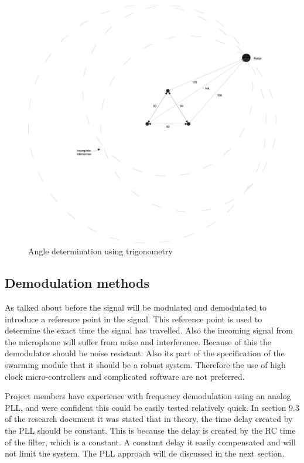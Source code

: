 \documentclass[10pt,a4paper]{article}
\begin{document}
\begin{figure}[H]
\centering
\includegraphics[width=1\textwidth]{trigonometry.pdf}
\caption{Angle determination using trigonometry}
\label{trigonometry}
\end{figure}

\subsection{Demodulation methods}
As talked about before the signal will be modulated and demodulated to introduce a reference point in the signal. This reference point is used to  determine the exact time the signal has travelled. Also the incoming signal from the microphone will suffer from noise and interference. Because of this the demodulator should be noise resistant. Also its part of the specification of the swarming module that it should be a robust system. Therefore the use of high clock micro-controllers and complicated software are not preferred.

Project members have experience with frequency demodulation using an analog PLL, and were confident this could be easily tested relatively quick. In section 9.3 of the research document it was stated that in theory, the time delay created by the PLL should be constant. This is because the delay is created by the RC time of the filter, which is a constant. A constant delay it easily compensated and will not limit the system. The PLL approach will de discussed in the next section.
\end{document}
